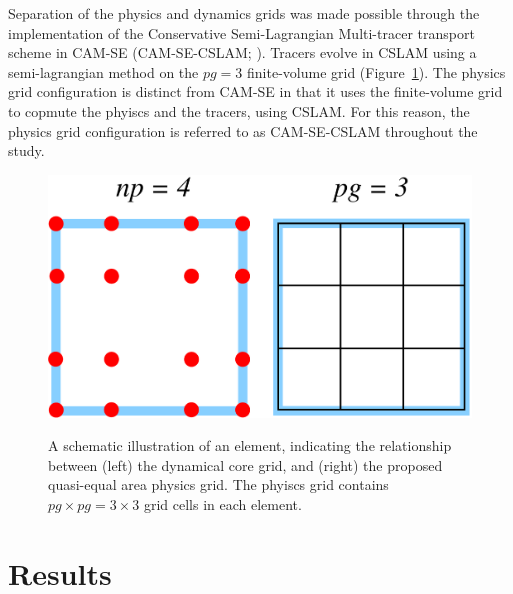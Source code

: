 \documentclass[twocol]{ametsoc}
\begin{document}
Separation of the physics and dynamics grids was made possible through the implementation of the Conservative Semi-Lagrangian Multi-tracer transport scheme in CAM-SE (CAM-SE-CSLAM; \cite{LTOUNGK2017MWR}). Tracers evolve in CSLAM using a semi-lagrangian method on the $pg=3$ finite-volume grid (Figure~\ref{fig:np4_pg3}). The physics grid configuration is distinct from CAM-SE in that it uses the finite-volume grid to copmute the phyiscs and the tracers, using CSLAM. For this reason, the physics grid configuration is referred to as CAM-SE-CSLAM throughout the study.

\begin{figure}[t]
\noindent\includegraphics[width=38pc,angle=0]{figs/np4_pg3.pdf}\\
\caption{A schematic illustration of an element, indicating the relationship between (left) the dynamical core grid, and (right) the proposed quasi-equal area physics grid. The phyiscs grid contains $pg\times pg=3\times 3$ grid cells in each element.}
\label{fig:np4_pg3}
\end{figure}




\section{Results}
\end{document}

